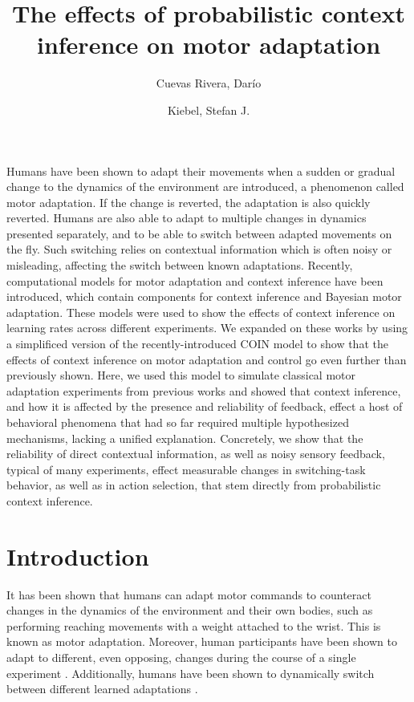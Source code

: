 \documentclass[a4paper,doc,floatsintext,natbib]{apa6}
\title{The effects of probabilistic context inference on motor adaptation}
\author[1,2]{Cuevas Rivera, Darío}
\author[1,2]{Kiebel, Stefan J.}
\affil[1]{Chair of Neuroimaging, Faculty of Psychology, Technische Universität Dresden, 01062 Dresden, Germany.}
\affil[2]{Centre for Tactile Internet with Human-in-the-Loop (CeTI)}
\affiliation{~}
\begin{document}
\maketitle

Humans have been shown to adapt their movements when a sudden or gradual change to the dynamics of the environment are introduced, a phenomenon called motor adaptation. If the change is reverted, the adaptation is also quickly reverted. Humans are also able to adapt to multiple changes in dynamics presented separately, and to be able to switch between adapted movements on the fly. Such switching relies on contextual information which is often noisy or misleading, affecting the switch between known adaptations. Recently, computational models for motor adaptation and context inference have been introduced, which contain components for context inference and Bayesian motor adaptation. These models were used to show the effects of context inference on learning rates across different experiments. We expanded on these works by using a simplificed version of the recently-introduced COIN model to show that the effects of context inference on motor adaptation and control go even further than previously shown. Here, we used this model to simulate classical motor adaptation experiments from previous works and showed that context inference, and how it is affected by the presence and reliability of feedback, effect a host of behavioral phenomena that had so far required multiple hypothesized mechanisms, lacking a unified explanation. Concretely, we show that the reliability of direct contextual information, as well as noisy sensory feedback, typical of many experiments, effect measurable changes in switching-task behavior, as well as in action selection, that stem directly from probabilistic context inference. 


\section{Introduction}
It has been shown that humans can adapt motor commands to counteract changes in the dynamics of the environment and their own bodies, such as performing reaching movements with a weight attached to the wrist. This is known as motor adaptation. Moreover, human participants have been shown to adapt to different, even opposing, changes during the course of a single experiment \citep{Gandolfo_Motor_1996,Shadmehr_Functional_1997}. Additionally, humans have been shown to dynamically switch between different learned adaptations \citep{Davidson_Scaling_2004,Ethier_Spontaneous_2008,Lee_Dual_2009}.
\end{document}
